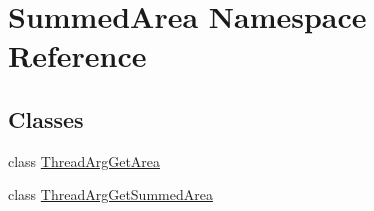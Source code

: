 \hypertarget{namespaceSummedArea}{\section{Summed\-Area Namespace Reference}
\label{namespaceSummedArea}
}
\subsection*{Classes}
\begin{DoxyCompactItemize}
\item 
class \hyperlink{classSummedArea_1_1ThreadArgGetArea}{Thread\-Arg\-Get\-Area}
\item 
class \hyperlink{classSummedArea_1_1ThreadArgGetSummedArea}{Thread\-Arg\-Get\-Summed\-Area}
\end{DoxyCompactItemize}
